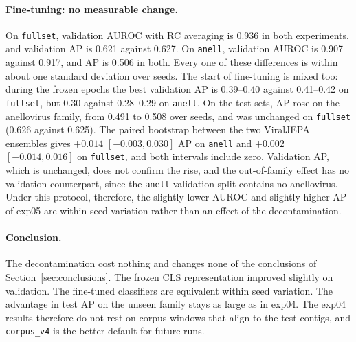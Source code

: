 \documentclass[10pt,twocolumn,a4paper]{article}
\begin{document}
\paragraph{Fine-tuning: no measurable change.} On \texttt{fullset}, validation
AUROC with RC averaging is 0.936 in both experiments, and validation AP is 0.621
against 0.627. On \texttt{anell}, validation AUROC is 0.907 against 0.917, and AP
is 0.506 in both. Every one of these differences is within about one standard
deviation over seeds. The start of fine-tuning is mixed too: during the frozen
epochs the best validation AP is 0.39--0.40 against 0.41--0.42 on
\texttt{fullset}, but 0.30 against 0.28--0.29 on \texttt{anell}. On the test sets,
AP rose on the anellovirus family, from 0.491 to 0.508 over seeds, and was
unchanged on \texttt{fullset} (0.626 against 0.625). The paired bootstrap between
the two ViralJEPA ensembles gives $+0.014$ $[-0.003, 0.030]$ AP on \texttt{anell}
and $+0.002$ $[-0.014, 0.016]$ on \texttt{fullset}, and both intervals include
zero. Validation AP, which is unchanged, does not confirm the rise, and the
out-of-family effect has no validation counterpart, since the \texttt{anell}
validation split contains no anellovirus. Under this protocol, therefore, the
slightly lower AUROC and slightly higher AP of exp05 are within seed variation
rather than an effect of the decontamination.

\paragraph{Conclusion.} The decontamination cost nothing and changes none of the
conclusions of Section~\ref{sec:conclusions}. The frozen CLS representation
improved slightly on validation. The fine-tuned classifiers are equivalent within
seed variation. The advantage in test AP on the unseen family stays as large as in
exp04. The exp04 results therefore do not rest on corpus windows that align to the
test contigs, and \texttt{corpus\_v4} is the better default for future runs.

\clearpage

{\scriptsize


}
\end{document}
